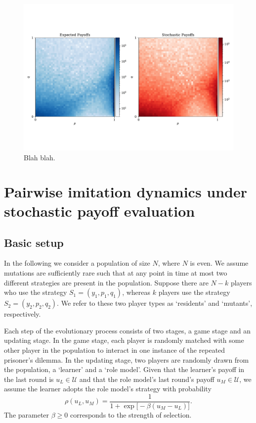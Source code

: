 \documentclass[11pt]{article}
\theoremstyle{plainCl1}
\theoremstyle{plainCl2}
\begin{document}




\begin{figure}[!htbp]
    \centering
    \includegraphics[width=\textwidth]{static/expected_and_stochastic_for_donation_game.pdf}
    \caption{Blah blah.}
\end{figure}



\section{Pairwise imitation dynamics under stochastic payoff evaluation}

\subsection{Basic setup} \label{Sec:BasicSetup}
In the following we consider a population of size $N$, where $N$ is even. We assume mutations are sufficiently rare such that at any point in time at most two different strategies are present in the population. Suppose there are $N\!-\!k$ players who use the strategy $S_1\!=\!(y_1,p_1,q_1)$, whereas $k$ players use the strategy $S_2\!=\!(y_2,p_2,q_2)$. We refer to these two player types as `residents' and `mutants', respectively. 

Each step of the evolutionary process consists of two stages, a game stage and an updating stage. In the game stage, each player is randomly matched with some other player in the population to interact in one instance of the repeated prisoner's dilemma. 
In the updating stage, two players are randomly drawn from the population, a `learner' and a `role model'. Given that the learner's payoff in the last round is $u_L\!\in\! \mathcal{U}$ and that the role model's last round's payoff $u_M\!\in\! \mathcal{U}$, we assume the learner adopts the role model's strategy with probability 
\begin{equation} \label{Eq:rho}
\rho(u_L, u_M) = \frac{1}{1\!+\!\exp\big[ \!-\!\beta (u_M\!-\!u_L) \big]}. 
\end{equation}
The parameter $\beta\!\ge\!0$ corresponds to the strength of selection.
\end{document}
